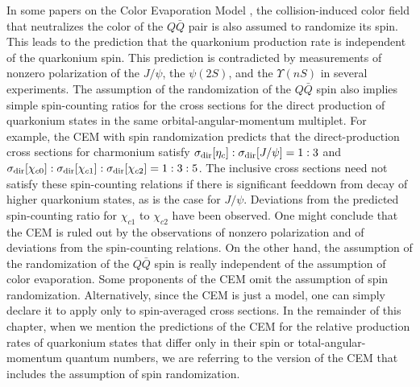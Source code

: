 In some papers on the Color Evaporation Model
\cite{Amundson:1996qr}, the collision-induced color field that
neutralizes the color of the $Q \bar Q$ pair is also assumed to
randomize its spin. This leads to the prediction that the quarkonium
production rate is independent of the quarkonium spin. This prediction
is contradicted by measurements of nonzero polarization of the
$J/\psi$, the $\psi(2S)$, and the $\Upsilon(nS)$ in several
experiments. The assumption of the randomization of the $Q \bar Q$ spin
also implies simple spin-counting ratios for the cross sections 
for the direct production of
quarkonium states in the same orbital-angular-momentum multiplet.
For example, the CEM with spin randomization predicts that 
the direct-production cross sections for charmonium satisfy 
$\sigma_{\rm dir}[\eta_c]:\sigma_{\rm dir}[J/\psi] = 1:3$ and  
$\sigma_{\rm dir}[\chi_{c0}]:\sigma_{\rm dir}[\chi_{c1}]:
        \sigma_{\rm dir}[\chi_{c2}] = 1:3:5$. 
The inclusive cross sections need not satisfy these spin-counting relations
if there is significant feeddown from decay of higher quarkonium states, 
as is the case for $J/\psi$.
Deviations from the predicted spin-counting ratio for
$\chi_{c1}$ to $\chi_{c2}$ have been observed.
One might conclude that the CEM is ruled out by the
observations of nonzero polarization 
and of deviations from the spin-counting relations. 
On the other hand, the assumption of
the randomization of the $Q \bar Q$ spin is really independent of the
assumption of color evaporation. 
Some proponents of the CEM omit the assumption of spin randomization.
Alternatively, since the CEM is just a model, one can simply declare 
it to apply only to spin-averaged cross sections.
In the remainder of this chapter, when we mention the predictions of the
CEM for the relative production rates of quarkonium states that differ
only in their spin or total-angular-momentum quantum numbers, we are
referring to the version of the CEM that includes the assumption of spin
randomization.

